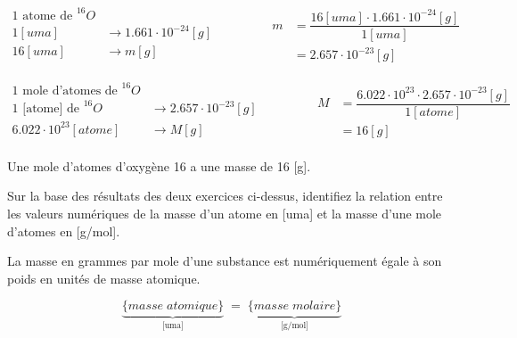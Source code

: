 \documentclass[
  11pt,
  french,
  a4paper,
  openany]{book}
\begin{document}
\begin{Answer}
\[ \begin{split}
    \text{1 atome de }^{16}O &\\
    1 [uma] &\longrightarrow 1.661\cdot10^{-24} [g]\\
    16 [uma] &\longrightarrow m [g]\\
    \end{split}
    \qquad\qquad
    \begin{split}
        m &= \dfrac{16 [uma] \cdot 1.661 \cdot 10^{-24} [g]}{1 [uma]}\\
        &= 2.657\cdot 10^{-23} [g]
    \end{split} \]

\[ \begin{split}
    \text{1 mole d'atomes de }^{16}O &\\
    \text{1 [atome] de } ^{16}O &\longrightarrow 2.657\cdot 10^{-23} [g]\\
    6.022\cdot 10^{23} [atome] &\longrightarrow M [g]\\
    \end{split}
    \qquad\qquad
    \begin{split}
    M &= \dfrac{6.022\cdot 10^{23} \cdot 2.657\cdot 10^{-23} [g]}{1 [atome]}\\
    &= 16 [g]
    \end{split} \]

Une mole d'atomes d'oxygène 16 a une masse de 16 {[}g{]}.

\end{Answer}

\clearpage

\begin{Exercise}

Sur la base des résultats des deux exercices ci-dessus, identifiez la relation entre les valeurs numériques de la masse d'un atome en {[}uma{]} et la masse d'une mole d'atomes en {[}g/mol{]}.



\end{Exercise}

\begin{Answer}
La masse en grammes par mole d'une substance est numériquement égale à son poids en unités de masse atomique.

\[ \underbrace{\{masse\;atomique\}}_\text{[uma]}\;=\;\underbrace{\{masse\;molaire\}}_\text{[g/mol]} \]

\end{Answer}
\end{document}
